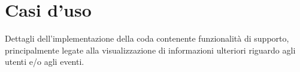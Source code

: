 \section{Casi d'uso}
Dettagli dell'implementazione della coda contenente funzionalità di supporto, principalmente legate alla visualizzazione di informazioni ulteriori riguardo agli utenti e/o agli eventi.